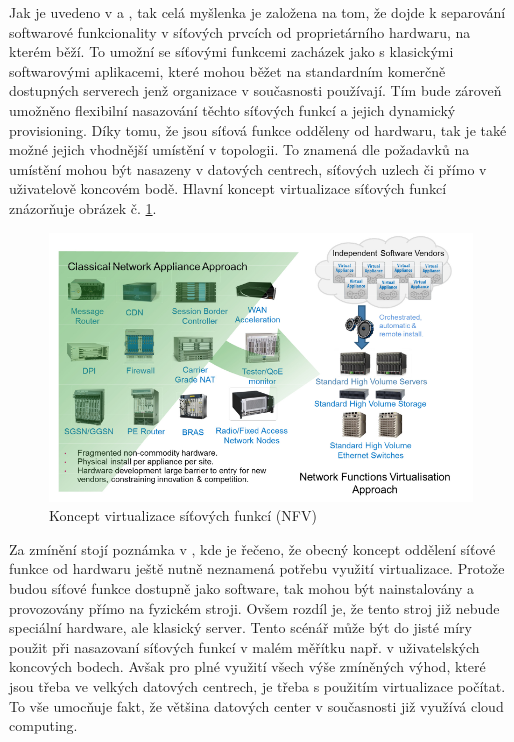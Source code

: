 Jak je uvedeno v \cite{NFVState} a \cite{NFVChalanges}, tak celá myšlenka je založena na tom, že dojde k separování softwarové funkcionality v síťových prvcích od proprietárního hardwaru, na kterém běží. To umožní se síťovými funkcemi zacházek jako s klasickými softwarovými aplikacemi, které mohou běžet na standardním komerčně dostupných serverech jenž organizace v současnosti používají. Tím bude zároveň umožněno flexibilní nasazování těchto síťových funkcí a jejich dynamický provisioning. Díky tomu, že jsou síťová funkce odděleny od hardwaru, tak je také možné jejich vhodnější umístění v topologii. To znamená dle požadavků na umístění mohou být nasazeny v datových centrech, síťových uzlech či přímo v uživatelově koncovém bodě. Hlavní koncept virtualizace síťových funkcí znázorňuje obrázek č. \ref{fig:vize_NFV}. 

\begin{figure}[h]
\begin{centering}
\includegraphics[scale=0.5]{images/vize_NFV}
\par\end{centering}
\caption{Koncept virtualizace síťových funkcí (NFV)\label{fig:vize_NFV}}
\end{figure}

Za zmínění stojí poznámka v \cite{NFVState}, kde je řečeno, že obecný koncept oddělení síťové funkce od hardwaru ještě nutně neznamená potřebu využití virtualizace. Protože budou síťové funkce dostupně jako software, tak mohou být nainstalovány a provozovány přímo na fyzickém stroji. Ovšem rozdíl je, že tento stroj již nebude speciální hardware, ale klasický server. Tento scénář může být do jisté míry použit při nasazovaní síťových funkcí v malém měřítku např. v uživatelských koncových bodech. Avšak pro plné využití všech výše zmíněných výhod, které jsou třeba ve velkých datových centrech, je třeba s použitím virtualizace počítat. To vše umocňuje fakt, že většina datových center v současnosti již využívá cloud computing. 


